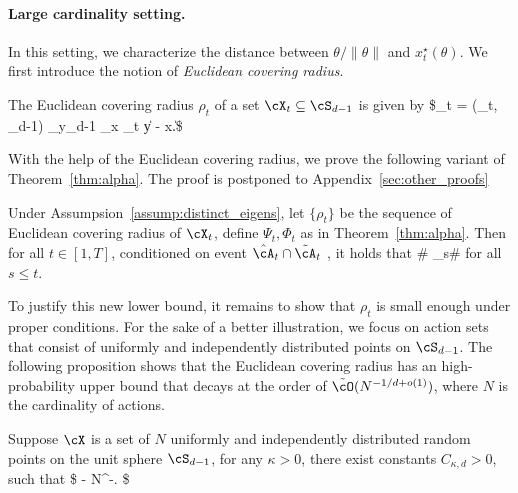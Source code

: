 \paragraph{Large cardinality setting.} In this setting, we characterize the distance between $\theta/\|\theta\|$ and  $x^\star_t(\theta)$. We first introduce the notion of \emph{Euclidean covering radius}.
\begin{definition} The Euclidean covering radius $\rho_t$ of a set $\cX_t \subseteq  \cS_{d-1}$ is given by 
	\$\rho_t = \rho(\cX_t, \cS_{d-1}) \coloneqq \max_{y\in \cS_{d-1}} \min_{x \in \cX_t} \| y - x\|.\$
\end{definition}

With the help of the Euclidean covering radius, we prove the following variant of Theorem~\ref{thm:alpha}. The proof is postponed to Appendix~\ref{sec:other_proofs}  

\begin{theorem}\label{thm:alpha_discrete}


	Under Assumpsion~\ref{assump:distinct_eigens}, let $\{\rho_t\}$ be the sequence of  Euclidean covering radius of $\cX_t$,   define $ \Psi_t,\Phi_t$ as in Theorem~\ref{thm:alpha}. Then for all $t \in [1,T]$, conditioned on event $\hat{\cA}_t \cap \tilde{\cA}_t$ , it holds that 	\#\label{eq:alpha_hat_3}
	\alpha_s\leq {}\#  for all $s \leq t$.


\end{theorem}

To justify this new lower bound, it remains to show that $ \rho_t$ is small enough under proper conditions. For the sake of a better illustration, we focus on action sets that consist of uniformly and independently distributed points on $\cS_{d-1}$.   The following proposition shows that the Euclidean covering radius has an high-probability upper bound that decays at the order of $\tilde{\cO}(N^{-1/d+o(1)})$, where $N$ is the cardinality of actions.
\begin{proposition}
	Suppose $\cX$ is a set of $N$ uniformly and independently distributed random points on the unit sphere $\cS_{d-1}$, for any $\kappa>0$, there exist constants $C_{\kappa,d} > 0 $, such that  
	\$
	\PP{}  - N^{-\kappa}.
	\$
\end{proposition}





